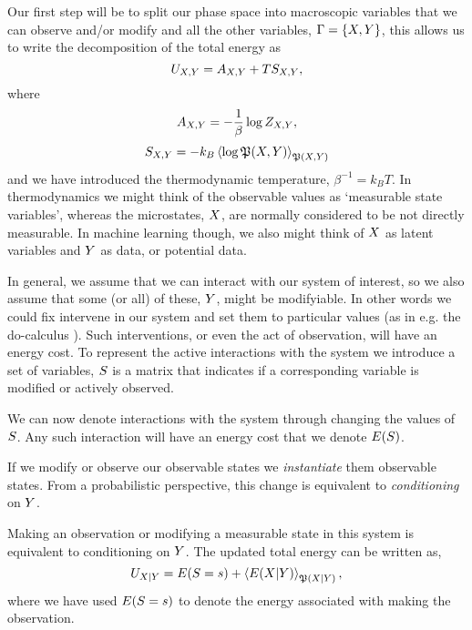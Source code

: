 \documentclass[]{article}
\begin{document}
Our first step will be to split our phase space into macroscopic variables that we can observe and/or modify and all the other variables, 
$\Gamma = \{X, Y\}$, this allows us to write the decomposition of the total energy as
\[
U_{X,Y} =
A_{X,Y} +
TS_{X,Y},
\] 
where 
\[
A_{X,Y} = - \frac{1}{\beta}\log
Z_{X,Y},
\] 
\[
S_{X,Y} = -k_B \left\langle \log
  \mathfrak{P}({X,Y}) \right\rangle_{\mathfrak{P}({X,Y})}
\]
and we have introduced the thermodynamic temperature, $\beta^{-1}=k_B T$.
In thermodynamics we might think of the observable values as
`measurable state variables', whereas the microstates,
$X$, are normally considered to be not directly
measurable. In machine learning though, we also might think of
$X$ as latent variables and $Y$ as data, or
potential data. 

In general, we assume that we can interact with our system of interest, so we also assume that some (or all) of these, $Y$, might be modifyiable. In other words we could fix intervene in our system and set them to particular values (as in e.g. the do-calculus \citep{Pearl-causal95}). Such interventions, or even the act of observation, will have an energy cost. To represent the active interactions with the system we introduce a set of variables,
$S$ is a matrix that indicates if 
a corresponding variable is modified or actively observed. 

We can now denote interactions with the system through changing the
values of $S$. Any such interaction will have an energy cost that we denote $E(S)$.

If we modify or observe our observable states we \emph{instantiate} them observable states. From a
probabilistic perspective, this change is equivalent to
\emph{conditioning} on \(Y\).

Making an observation or modifying a measurable state in this system is equivalent to conditioning on
\(Y\). The updated total energy can be written as,
\[
U_{X|Y} =
E(S=s) +
\left\langle E({X|Y}) \right\rangle_{\mathfrak{P}({X|Y})},
\]
where we have used $E(S=s)$
to denote the energy associated with making the observation.
\end{document}
